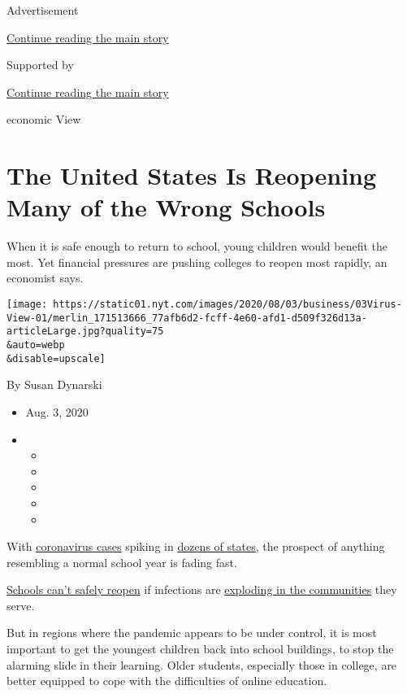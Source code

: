 Advertisement

\protect\hyperlink{after-top}{Continue reading the main story}

Supported by

\protect\hyperlink{after-sponsor}{Continue reading the main story}

economic View

\hypertarget{the-united-states-is-reopening-many-of-the-wrong-schools}{%
\section{The United States Is Reopening Many of the Wrong
Schools}\label{the-united-states-is-reopening-many-of-the-wrong-schools}}

When it is safe enough to return to school, young children would benefit
the most. Yet financial pressures are pushing colleges to reopen most
rapidly, an economist says.

\texttt{[image: https://static01.nyt.com/images/2020/08/03/business/03Virus-View-01/merlin\_171513666\_77afb6d2-fcff-4e60-afd1-d509f326d13a-articleLarge.jpg?quality=75\\\&auto=webp\\\&disable=upscale]}

By Susan Dynarski

\begin{itemize}
\item
  Aug. 3, 2020
\item
  \begin{itemize}
  \item
  \item
  \item
  \item
  \item
  \end{itemize}
\end{itemize}

With \href{https://www.nytimes.com/news-event/coronavirus}{coronavirus
cases} spiking in
\href{https://www.nytimes.com/interactive/2020/07/09/us/coronavirus-cases-reopening-trends.html}{dozens
of states}, the prospect of anything resembling a normal school year is
fading fast.

\href{https://www.nytimes.com/2020/08/03/us/school-closing-coronavirus.html}{Schools
can't safely reopen} if infections are
\href{https://www.nytimes.com/interactive/2020/07/31/us/coronavirus-school-reopening-risk.html}{exploding
in the communities} they serve.

But in regions where the pandemic appears to be under control, it is
most important to get the youngest children back into school buildings,
to stop the alarming slide in their learning. Older students, especially
those in college, are better equipped to cope with the difficulties of
online education.


